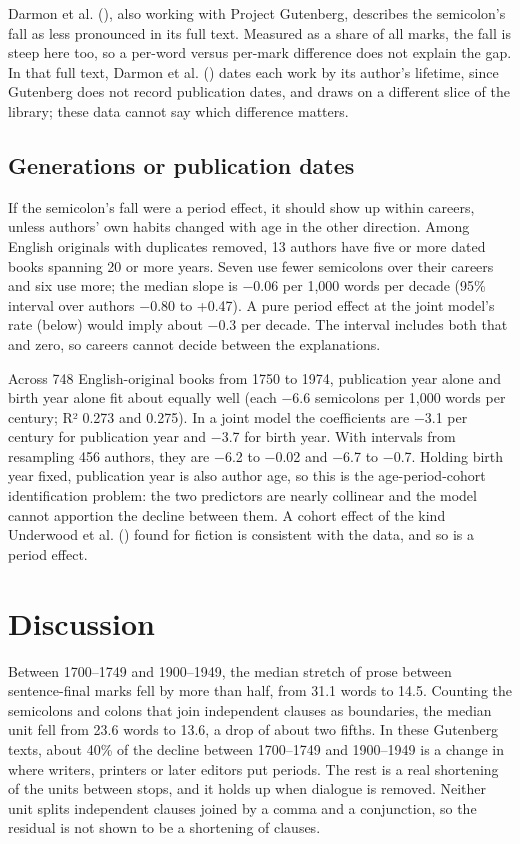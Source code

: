 \documentclass[
  11pt,
]{article}
\begin{document}
Darmon et al. (), also working with Project Gutenberg, describes the semicolon's fall as less pronounced in its full text. Measured as a share of all marks, the fall is
steep here too, so a per-word versus per-mark difference does not explain the gap. In that full text, Darmon et al. () dates each work by its author's lifetime, since
Gutenberg does not record publication dates, and draws on a different slice of the library; these data cannot say which difference matters.

\subsection{Generations or publication dates}\label{generations-or-publication-dates}

If the semicolon's fall were a period effect, it should show up within careers, unless authors' own habits changed with age in the other direction. Among English originals with duplicates removed, 13
authors have five or more dated books spanning 20 or more years. Seven use fewer semicolons over their careers and six use more; the median slope is −0.06 per 1,000 words per decade (95\% interval
over authors −0.80 to +0.47). A pure period effect at the joint model's rate (below) would imply about −0.3 per decade. The interval includes both that and zero, so careers cannot decide between the
explanations.

Across 748 English-original books from 1750 to 1974, publication year alone and birth year alone fit about equally well (each −6.6 semicolons per 1,000 words per century; R² 0.273 and 0.275). In a
joint model the coefficients are −3.1 per century for publication year and −3.7 for birth year. With intervals from resampling 456 authors, they are −6.2 to −0.02 and −6.7 to −0.7. Holding birth year
fixed, publication year is also author age, so this is the age-period-cohort identification problem: the two predictors are nearly collinear and the model cannot apportion the decline between them. A
cohort effect of the kind Underwood et al. () found for fiction is consistent with the data, and so is a period effect.

\section{Discussion}\label{discussion}

Between 1700--1749 and 1900--1949, the median stretch of prose between sentence-final marks fell by more than half, from 31.1 words to 14.5. Counting the semicolons and colons that join independent
clauses as boundaries, the median unit fell from 23.6 words to 13.6, a drop of about two fifths. In these Gutenberg texts, about 40\% of the decline between 1700--1749 and 1900--1949 is a change in
where writers, printers or later editors put periods. The rest is a real shortening of the units between stops, and it holds up when dialogue is removed. Neither unit splits independent clauses joined
by a comma and a conjunction, so the residual is not shown to be a shortening of clauses.
\end{document}
